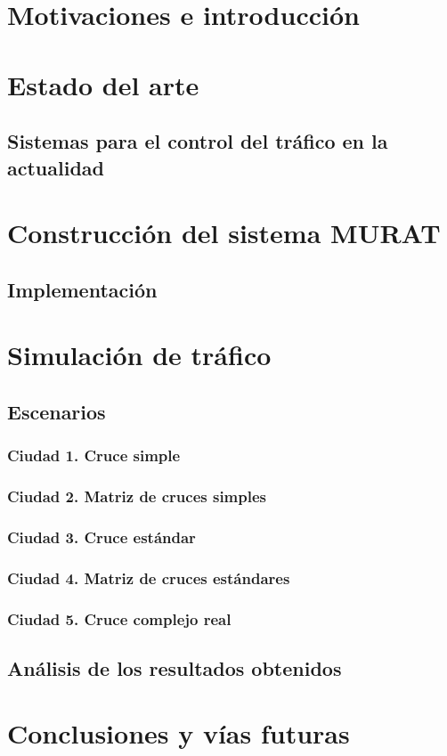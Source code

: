\part{Motivaciones e introducción}


\part{Estado del arte}
\chapter{Sistemas para el control del tráfico en la actualidad}

\part{Construcción del sistema MURAT}




\chapter{Implementación}

\part{Simulación de tráfico}
\chapter{Escenarios}
\section{Ciudad 1. Cruce simple}
\section{Ciudad 2. Matriz de cruces simples}
\section{Ciudad 3. Cruce estándar}
\section{Ciudad 4. Matriz de cruces estándares}
\section{Ciudad 5. Cruce complejo real}

\chapter{Análisis de los resultados obtenidos}

\part{Conclusiones y vías futuras}
